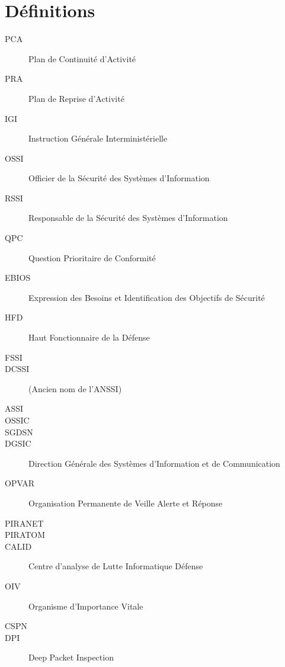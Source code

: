 \section{Définitions}
\begin{description}
 \item[PCA] Plan de Continuité d'Activité
 \item[PRA] Plan de Reprise d'Activité
 \item[IGI] Instruction Générale Interministérielle
 \item[OSSI] Officier de la Sécurité des Systèmes d'Information
 \item[RSSI] Responsable de la Sécurité des Systèmes d'Information
 \item[QPC] Question Prioritaire de Conformité
 \item[EBIOS] Expression des Besoins et Identification des Objectifs de Sécurité
 \item[HFD] Haut Fonctionnaire de la Défense
 \item[FSSI] 
 \item[DCSSI] (Ancien nom de l'ANSSI)
 \item[ASSI]
 \item[OSSIC]
 \item[SGDSN]
 \item[DGSIC] Direction Générale des Systèmes d'Information et de Communication
 \item[OPVAR] Organisation Permanente de Veille Alerte et Réponse
 \item[PIRANET]
 \item[PIRATOM] 
 \item[CALID] Centre d’analyse de Lutte Informatique Défense
 \item[OIV] Organisme d'Importance Vitale
 \item[CSPN] 
 \item[DPI] Deep Packet Inspection
\end{description}
